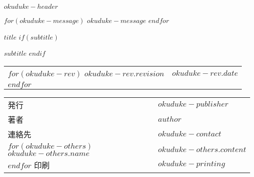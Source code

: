 \backmatter
$okuduke-header$

$for(okuduke-message)$
$okuduke-message$
$endfor$


\begin{center}
\textsf{$title$}
$if(subtitle)$

$subtitle$
$endif$

\begin{tabular}{ll}
$for(okuduke-rev)$
$okuduke-rev.revision$ & $okuduke-rev.date$ \\
$endfor$
\end{tabular}

\begin{tabular}{ll} \toprule
    発行      & $okuduke-publisher$ \\
    著者      & $author$ \\
    連絡先    & $okuduke-contact$ \\
    $for(okuduke-others)$
    $okuduke-others.name$ & $okuduke-others.content$ \\
    $endfor$
    印刷      & $okuduke-printing$  \\ \bottomrule
\end{tabular}
\end{center}
